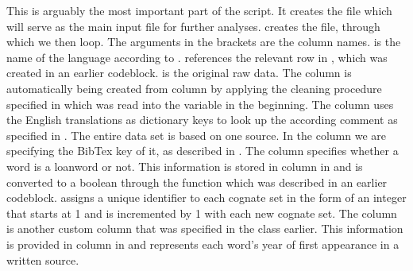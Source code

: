 \documentclass[letterpaper,10pt,english]{sphinxmanual}
\begin{document}
{{{{\sphinxAtStartPar
This is arguably the most important part of the script. It creates the file
 which will serve as the main input file for further
analyses.  creates the file, through which
we then loop. The arguments in the brackets are the column names.
 is the name of the language according to
.  references the relevant row in
, which was created in an earlier code\sphinxhyphen{}block.  is
the original raw data. The column  is automatically being created from
column  by applying the cleaning procedure specified in
 which was read into the
 variable in the beginning. The column
 uses the English translations as dictionary keys to look up the
according comment as specified in . The entire data set is
based on one source. In the column  we are specifying the BibTex key
of it, as described in . The column  specifies
whether a word is a loanword or not. This information is stored in column
 in  and is converted to a boolean through the
function  which was described in an earlier code\sphinxhyphen{}block.
 assigns a unique identifier to each cognate set in the form of an
integer that starts at 1 and is incremented by 1 with each new cognate set.
The column  is another custom column that was specified in the
 class earlier. This information is provided in column
 in  and represents each word’s year of first
appearance in a written source.

}}}}
\end{document}
